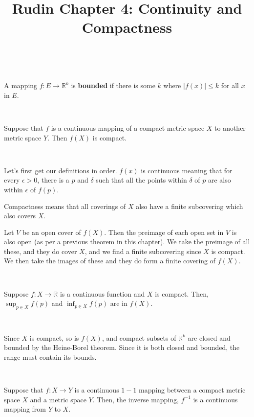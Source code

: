 \documentclass{article}
\title{Rudin Chapter 4: Continuity and Compactness}
\begin{document}
\maketitle

\begin{definition}[Boundedness]
\

A mapping $f: E \to \mathbb{R}^k$ is \textbf{bounded} if there is some $k$ where $\vert f(x) \vert \leq k$ for all $x$ in $E$.
\end{definition}

\begin{theorem}
\

Suppose that $f$ is a continuous mapping of a compact metric space $X$ to another metric space $Y$. Then $f(X)$ is compact.
\end{theorem}

\begin{customproof}
\

Let's first get our definitions in order. $f(x)$ is continuous meaning that for every $\epsilon >0$, there is a $p$ and $\delta$ such that all the points within $\delta$ of $p$ are also within $\epsilon$ of $f(p)$. 

Compactness means that all coverings of $X$ also have a finite subcovering which also covers $X$.

Let $V$ be an open cover of $f(X)$. Then the preimage of each open set in $V$ is also open (as per a previous theorem in this chapter). We take the preimage of all these, and they do cover $X$, and we find a finite subcovering since $X$ is compact. We then take the images of these and they do form a finite covering of $f(X)$. 
\end{customproof}

\begin{theorem}
\

Suppose $f: X \to \mathbb{R}$ is a continuous function and $X$ is compact. Then, $\sup_{p \in X} f(p)$ and $\inf_{p \in X} f(p)$ are in $f(X)$.
\end{theorem}

\begin{customproof}
\

Since $X$ is compact, so is $f(X)$, and compact subsets of $\mathbb{R}^k$ are closed and bounded by the Heine-Borel theorem. Since it is both closed and bounded, the range must contain its bounds. 
\end{customproof}

\begin{theorem}
\

Suppose that $f: X \to Y$ is a continuous $1-1$ mapping between a compact metric space $X$ and a metric space $Y$. Then, the inverse mapping, $f ^{-1}$ is a continuous mapping from $Y$ to $X$.
\end{theorem}
\end{document}
